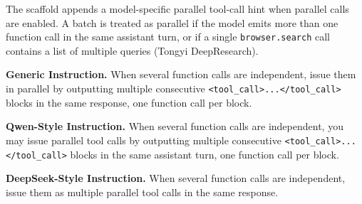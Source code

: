 \label{box:parallel-instruction}
The scaffold appends a model-specific parallel tool-call hint when parallel calls are enabled. A batch is treated as parallel if the model emits more than one function call in the same assistant turn, or if a single \texttt{browser.search} call contains a list of multiple queries (Tongyi DeepResearch).

\begin{custombox}[title=Parallel Tool-Call Instruction]
\textbf{Generic Instruction.}
When several function calls are independent, issue them in parallel by outputting multiple consecutive \texttt{<tool\_call>...</tool\_call>} blocks in the same response, one function call per block.

\vspace{6pt}

\textbf{Qwen-Style Instruction.}
When several function calls are independent, you may issue parallel tool calls by outputting multiple consecutive \texttt{<tool\_call>...</tool\_call>} blocks in the same assistant turn, one function call per block.

\vspace{6pt}

\textbf{DeepSeek-Style Instruction.}
When several function calls are independent, issue them as multiple parallel tool calls in the same response.
\end{custombox}
